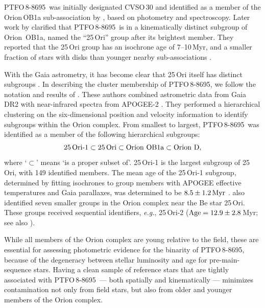 \documentclass[12pt,twocolumn,tighten]{aastex62}
\newcommand{\ptfo}{PTFO$\,$8-8695}
\begin{document}
\ptfo\ was initially designated CVSO\,30 and identified as a member of
the Orion$\,$OB1a sub-association by \citet{briceno_cida_2005}, based
on photometry and spectroscopy.  Later work by \citet{briceno_25_2007}
clarified that \ptfo\ is in a kinematically distinct subgroup of
Orion~OB1a, named the ``25$\,$Ori'' group after its brightest member.
They reported that the 25$\,$Ori group has an isochrone age of
7--10$\,$Myr, and a smaller fraction of stars with disks than younger
nearby sub-associations \citep{hernandez_spitzer_ob1_2007}.

With the Gaia astrometry, it has become clear that 25$\,$Ori itself
has distinct subgroups
\citep{kounkel_apogee2_2018,briceno_cidaII_2019}.  In describing the
cluster membership of \ptfo, we follow the notation and results of
\citet{kounkel_apogee2_2018}.  These authors combined astrometric data
from Gaia DR2 with near-infrared spectra from APOGEE-2
\citep{gunn_sdss_2006,majewski_apache_2017,blanton_sloan_2017,zasowski_target_2017,cottle_apogee2_2018}.
They performed a hierarchical clustering on the six-dimensional
position and velocity information to identify subgroups within the
Orion complex.  From smallest to largest, \ptfo\ was identified as a
member of the following hierarchical subgroups:
\begin{equation}
  {\rm 25\,Ori\text{-}1}
  \subset {\rm 25\,Ori}
  \subset {\rm Orion\ OB1a}
  \subset {\rm Orion\ D},
\end{equation}
where `$\subset$' means `is a proper subset of'.  25$\,$Ori-1 is the
largest subgroup of 25$\,$Ori, with 149 identified members.  The mean
age of the 25$\,$Ori-1 subgroup, determined by fitting isochrones to
group members with APOGEE effective temperatures and Gaia parallaxes,
was determined to be $8.5\pm1.2\,{\rm Myr}$ \citep[see][Section
2.3]{kounkel_apogee2_2018}.  \citet{kounkel_apogee2_2018} also
identified seven smaller groups in the Orion complex near the Be star
25$\,$Ori. These groups received sequential identifiers, {\it e.g.},
25$\,$Ori-2 (${\rm Age} =12.9\pm2.8\,$Myr; see also
\citealt{briceno_cidaII_2019}).

 {While all members of the Orion complex are young relative to
the field,} these  are essential for
assessing  photometric evidence for the binarity of
\ptfo, because of the degeneracy between stellar luminosity and age
for pre-main-sequence stars.  Having a clean sample of reference stars
that are tightly associated with \ptfo\ --- both spatially and
kinematically --- minimizes contamination not only from field stars,
but also from older and younger members of the Orion complex.
\end{document}
